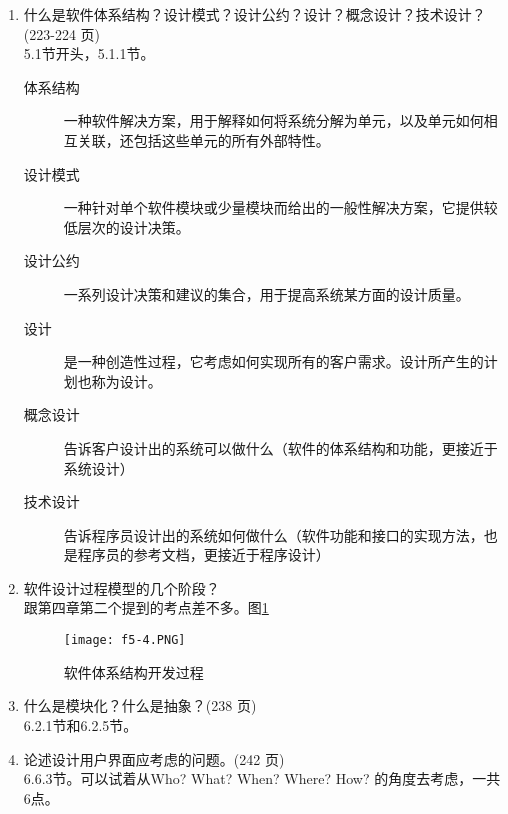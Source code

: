 \documentclass[14pt, letterpaper, UTF8, fontset=windowsnew, heading=true]{article}
\begin{document}
\begin{enumerate}
	\item 什么是软件体系结构？设计模式？设计公约？设计？概念设计？技术设计？(223-224
	页) \\
	5.1节开头，5.1.1节。
	\begin{description}
		\item[体系结构] 一种软件解决方案，用于解释如何将系统分解为单元，以及单元如何相互关联，还包括这些单元的所有外部特性。
		\item[设计模式] 一种针对单个软件模块或少量模块而给出的一般性解决方案，它提供较低层次的设计决策。
		\item[设计公约] 一系列设计决策和建议的集合，用于提高系统某方面的设计质量。
		\item[设计] 是一种创造性过程，它考虑如何实现所有的客户需求。设计所产生的计划也称为设计。
		\item[概念设计] 告诉客户设计出的系统可以做什么（软件的体系结构和功能，更接近于系统设计）
		\item[技术设计] 告诉程序员设计出的系统如何做什么（软件功能和接口的实现方法，也是程序员的参考文档，更接近于程序设计）
	\end{description}
	
	\item 软件设计过程模型的几个阶段？ \\
	跟第四章第二个提到的考点差不多。图\ref{fig:archtechturedev}
	\begin{figure}[h]
		\centering
		\texttt{[image: f5-4.PNG]}
		\caption{软件体系结构开发过程}
		\label{fig:archtechturedev}
	\end{figure}
	
	
	\item 什么是模块化？什么是抽象？(238 页) \\
	6.2.1节和6.2.5节。
	
	\item 论述设计用户界面应考虑的问题。(242 页) \\
	6.6.3节。可以试着从Who? What? When? Where? How? 的角度去考虑，一共6点。
	

\end{enumerate}
\end{document}
